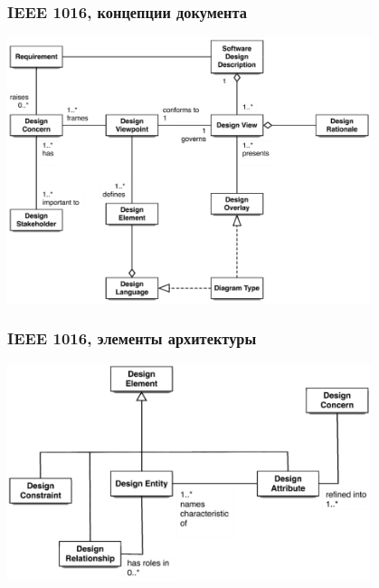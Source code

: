 \documentclass[xetex,mathserif,serif]{beamer}
\begin{document}
	\begin{frame}
		\frametitle{IEEE 1016, концепции документа}
		\begin{center}
			\includegraphics[width=0.8\textwidth]{ieee1016Concepts.png}
		\end{center}
	\end{frame}

	\begin{frame}
		\frametitle{IEEE 1016, элементы архитектуры}
		\begin{center}
			\includegraphics[width=0.8\textwidth]{ieee1016ArchitectureElements.png}
		\end{center}
	\end{frame}
\end{document}
